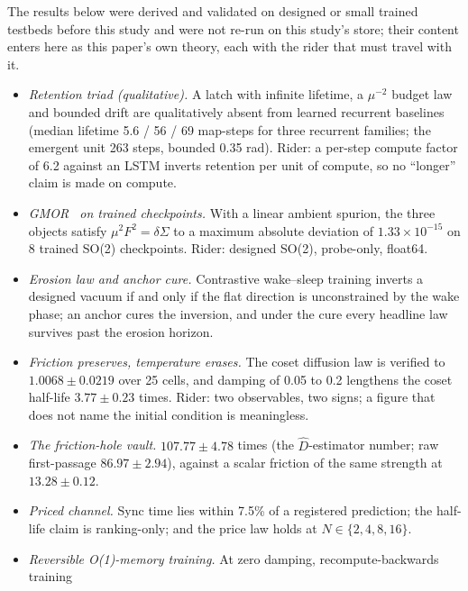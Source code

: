 \documentclass{article} %
\newcommand{\sci}[2]{\ensuremath{#1\times10^{#2}}}
\begin{document}
The results below were derived and validated on designed or small trained testbeds before this
study and were not re-run on this study's store; their content enters here as this paper's own
theory, each with the rider that must travel with it. %
\begin{itemize}[leftmargin=*,itemsep=1pt]
\item \emph{Retention triad (qualitative).} A latch with infinite lifetime, a $\mu^{-2}$ budget
  law and bounded drift are qualitatively absent from learned recurrent baselines (median lifetime 5.6
  / 56 / 69 map-steps for three recurrent families; the emergent unit 263 steps, bounded 0.35 rad).
  Rider: a per-step compute factor of 6.2 against an LSTM inverts retention per unit of compute, so
  no ``longer'' claim is made on compute. %
\item \emph{GMOR~\citep{gellmann1968behavior} on trained checkpoints.} With a linear ambient spurion, the three objects satisfy
  $\mu^2F^2=\delta\Sigma$ to a maximum absolute deviation of \sci{1.33}{-15} on 8 trained SO(2)
  checkpoints. Rider: designed SO(2), probe-only, float64. %
\item \emph{Erosion law and anchor cure.} Contrastive wake--sleep training inverts a designed
  vacuum if and only if the flat direction is unconstrained by the wake phase; an anchor cures the
  inversion, and under the cure every headline law survives past the erosion horizon. %
\item \emph{Friction preserves, temperature erases.} The coset diffusion law is verified to
  $1.0068\pm0.0219$ over 25 cells, and damping of 0.05 to 0.2 lengthens the coset half-life
  $3.77\pm0.23$ times. Rider: two observables, two signs; a figure that does not name the initial
  condition is meaningless. %
\item \emph{The friction-hole vault.} $107.77\pm4.78$ times (the $\hat D$-estimator number; raw
  first-passage $86.97\pm2.94$), against a scalar friction of the same strength at
  $13.28\pm0.12$. %
\item \emph{Priced channel.} Sync time lies within 7.5\% of a registered prediction; the half-life
  claim is ranking-only; and the price law holds at $N\in\{2,4,8,16\}$. %
\item \emph{Reversible O(1)-memory training.} At zero damping, recompute-backwards training

\end{itemize}
\end{document}
